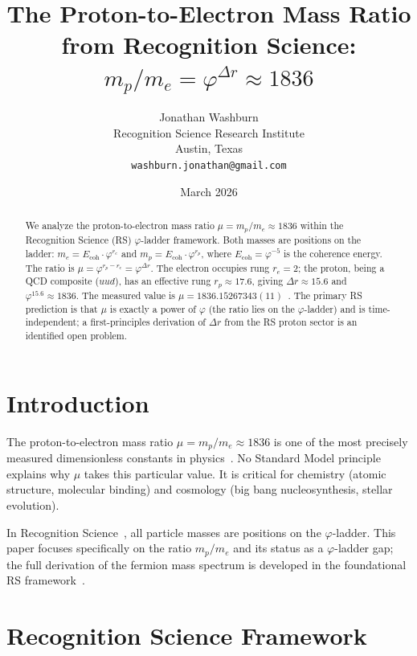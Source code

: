 \documentclass[12pt,a4paper]{article}
\title{The Proton-to-Electron Mass Ratio from Recognition Science:\\
$m_p/m_e = \varphi^{\Delta r} \approx 1836$}
\author{Jonathan Washburn\\
Recognition Science Research Institute\\
Austin, Texas\\
\texttt{washburn.jonathan@gmail.com}}
\date{March 2026}
\theoremstyle{definition}
\theoremstyle{remark}
\begin{document}
\maketitle

\begin{abstract}
We analyze the proton-to-electron mass ratio
$\mu = m_p/m_e \approx 1836$ within the Recognition Science (RS)
$\varphi$-ladder framework.  Both masses are positions on the ladder:
$m_e = E_{\mathrm{coh}} \cdot \varphi^{r_e}$ and
$m_p = E_{\mathrm{coh}} \cdot \varphi^{r_p}$, where
$E_{\mathrm{coh}} = \varphi^{-5}$ is the coherence energy.  The
ratio is $\mu = \varphi^{r_p - r_e} = \varphi^{\Delta r}$.  The
electron occupies rung $r_e = 2$; the proton, being a QCD
composite ($uud$), has an effective rung
$r_p \approx 17.6$, giving
$\Delta r \approx 15.6$ and $\varphi^{15.6} \approx 1836$.  The
measured value is $\mu = 1836.15267343(11)$~\cite{CODATA2022}.
The primary RS prediction is that $\mu$ is exactly a power of
$\varphi$ (the ratio lies on the $\varphi$-ladder) and is
time-independent; a first-principles derivation of $\Delta r$ from
the RS proton sector is an identified open problem.
\end{abstract}

\section{Introduction}
\label{sec:intro}

The proton-to-electron mass ratio $\mu = m_p/m_e \approx 1836$
is one of the most precisely measured dimensionless constants in
physics~\cite{CODATA2022}.  No Standard Model principle explains
why $\mu$ takes this particular value.  It is critical for
chemistry (atomic structure, molecular binding) and cosmology
(big bang nucleosynthesis, stellar evolution).

In Recognition Science~\cite{RS_Axioms}, all particle masses are
positions on the $\varphi$-ladder.  This paper focuses specifically
on the ratio $m_p/m_e$ and its status as a $\varphi$-ladder gap;
the full derivation of the fermion mass spectrum is developed in
the foundational RS framework~\cite{RS_Axioms}.

\section{Recognition Science Framework}
\label{sec:framework}
\end{document}
